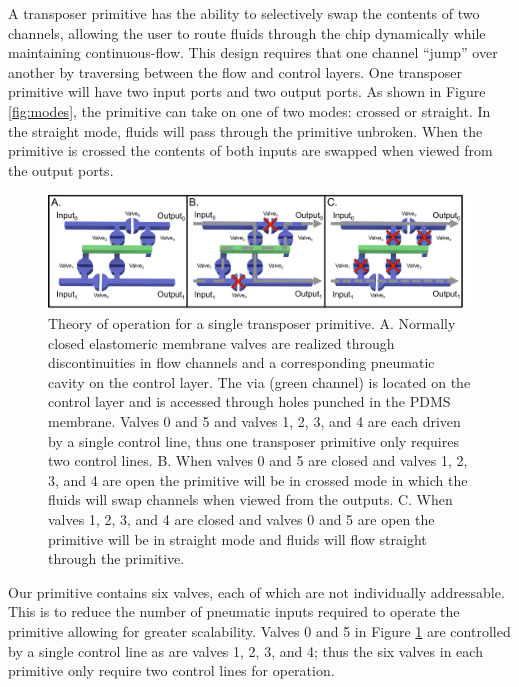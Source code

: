 A transposer primitive has the ability to selectively swap the contents of two channels, allowing the user to route fluids through the chip dynamically while maintaining continuous-flow. This design requires that one channel ``jump'' over another by traversing between the flow and control layers. One transposer primitive will have two input ports and two output ports. As shown in Figure \ref{fig:modes}, the primitive can take on one of two modes: crossed or straight. In the straight mode, fluids will pass through the primitive unbroken. When the primitive is crossed the contents of both inputs are swapped when viewed from the output ports. 
\begin{figure}[h]
  \begin{minipage}[t]{0.99\linewidth}\centering
    \includegraphics[width=14cm]{fig1.pdf}
    \medskip
  \end{minipage}\hfill
  \caption[Transposer theory of operation]{Theory of operation for a single transposer primitive. A. Normally closed elastomeric membrane valves are realized through discontinuities in flow channels and a corresponding pneumatic cavity on the control layer. The via (green channel) is located on the control layer and is accessed through holes punched in the PDMS membrane. Valves 0 and 5 and valves 1, 2, 3, and 4 are each driven by a single control line, thus one transposer primitive only requires two control lines. B. When valves 0 and 5 are closed and valves 1, 2, 3, and 4 are open the primitive will be in crossed mode in which the fluids will swap channels when viewed from the outputs. C. When valves 1, 2, 3, and 4 are closed and valves 0 and 5 are open the primitive will be in straight mode and fluids will flow straight through the primitive.}
    \label{fig:op}
\end{figure}

Our primitive contains six valves, each of which are not individually addressable. This is to reduce the number of pneumatic inputs required to operate the primitive allowing for greater scalability. Valves 0 and 5 in Figure \ref{fig:op} are controlled by a single control line as are valves 1, 2, 3, and 4; thus the six valves in each primitive only require two control lines for operation.

